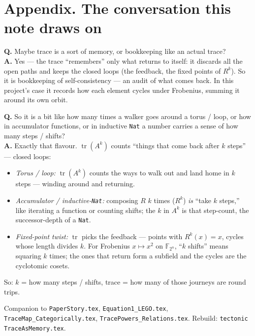 \documentclass[11pt]{article}
\newcommand{\tr}{\operatorname{tr}}
\newcommand{\lc}[1]{\texttt{\small #1}}
\begin{document}
\section*{Appendix. The conversation this note draws on}

\begin{quotebox}\small
\textbf{Q.} Maybe trace is a sort of memory, or bookkeeping like an actual
trace?\\[3pt]
\textbf{A.} Yes --- the trace ``remembers'' only what returns to itself: it
discards all the open paths and keeps the closed loops (the feedback, the fixed
points of $R^k$). So it is bookkeeping of self-consistency --- an audit of what
comes back. In this project's case it records how each element cycles under
Frobenius, summing it around its own orbit.
\end{quotebox}

\begin{quotebox}\small
\textbf{Q.} So it is a bit like how many times a walker goes around a torus /
loop, or how in accumulator functions, or in inductive \lc{Nat} a number carries
a sense of how many steps / shifts?\\[3pt]
\textbf{A.} Exactly that flavour. $\tr(A^k)$ counts ``things that come back after
$k$ steps'' --- closed loops:
\begin{itemize}\setlength\itemsep{0pt}
\item \emph{Torus / loop:} $\tr(A^k)$ counts the ways to walk out and land home
in $k$ steps --- winding around and returning.
\item \emph{Accumulator / inductive-\lc{Nat}:} composing $R$ $k$ times ($R^k$)
\emph{is} ``take $k$ steps,'' like iterating a function or counting shifts; the
$k$ in $A^k$ is that step-count, the successor-depth of a \lc{Nat}.
\item \emph{Fixed-point twist:} $\tr$ picks the feedback --- points with
$R^k(x)=x$, cycles whose length divides $k$. For Frobenius $x\mapsto x^2$ on
$\mathbb F_{2^n}$, ``$k$ shifts'' means squaring $k$ times; the ones that return
form a subfield and the cycles are the cyclotomic cosets.
\end{itemize}
So: $k$ = how many steps / shifts, trace = how many of those journeys are round
trips.
\end{quotebox}

\vfill
\begin{center}\footnotesize
Companion to \texttt{PaperStory.tex}, \texttt{Equation1\_LEGO.tex},
\texttt{TraceMap\_Categorically.tex}, \texttt{TracePowers\_Relations.tex}.
Rebuild: \texttt{tectonic TraceAsMemory.tex}.
\end{center}
\end{document}
